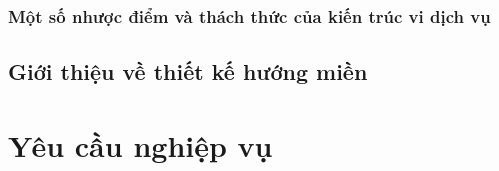 \documentclass{article} %
\begin{document}
% 

\subsubsection{Một số nhược điểm và thách thức của kiến trúc vi dịch vụ}



\subsection{Giới thiệu về thiết kế hướng miền}

% 


\section{Yêu cầu nghiệp vụ}

% 




% 


% 


\end{document}
